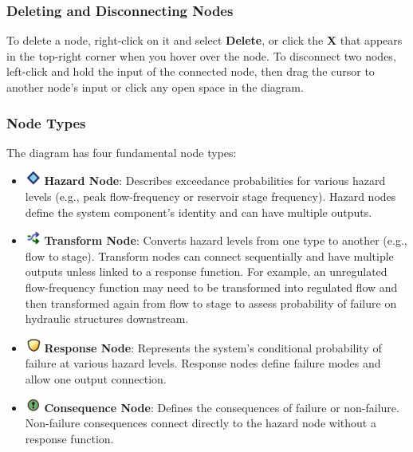 \documentclass[
]{book}
\begin{document}
\hypertarget{deleting-and-disconnecting-nodes}{%
\subsubsection*{Deleting and Disconnecting Nodes}\label{deleting-and-disconnecting-nodes}}

To delete a node, right-click on it and select \textbf{Delete}, or click the \textbf{X} that appears in the top-right corner when you hover over the node. To disconnect two nodes, left-click and hold the input of the connected node, then drag the cursor to another node's input or click any open space in the diagram.

\hypertarget{node-types}{%
\subsubsection*{Node Types}\label{node-types}}

The diagram has four fundamental node types:

\begin{itemize}
\item
  \includegraphics{images/hazardIcon.png} \textbf{Hazard Node}: Describes exceedance probabilities for various hazard levels (e.g., peak flow-frequency or reservoir stage frequency). Hazard nodes define the system component's identity and can have multiple outputs.
\item
  \includegraphics{images/transformIcon.png} \textbf{Transform Node}: Converts hazard levels from one type to another (e.g., flow to stage). Transform nodes can connect sequentially and have multiple outputs unless linked to a response function. For example, an unregulated flow-frequency function may need to be transformed into regulated flow and then transformed again from flow to stage to assess probability of failure on hydraulic structures downstream.
\item
  \includegraphics{images/responseIcon.png} \textbf{Response Node}: Represents the system's conditional probability of failure at various hazard levels. Response nodes define failure modes and allow one output connection.
\item
  \includegraphics{images/consequenceIcon.png} \textbf{Consequence Node}: Defines the consequences of failure or non-failure. Non-failure consequences connect directly to the hazard node without a response function.
\end{itemize}
\end{document}
